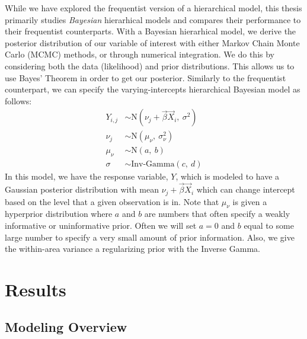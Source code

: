 \documentclass[12pt,twoside]{reedthesis}
\begin{document}
While we have explored the frequentist version of a hierarchical model, this thesis primarily studies \emph{Bayesian} hierarhical models and compares their performance to their frequentist counterparts. With a Bayesian hierarhical model, we derive the posterior distribution of our variable of interest with either Markov Chain Monte Carlo (MCMC) methods, or through numerical integration. We do this by considering both the data (likelihood) and prior distributions. This allows us to use Bayes' Theorem in order to get our posterior. Similarly to the frequentist counterpart, we can specify the varying-intercepts hierarchical Bayesian model as follows:
\begin{align}
Y_{i,j} &\sim \text{N}(\nu_j + \vec\beta\vec X_i,~ \sigma^2) \\
\nu_j &\sim \text{N}(\mu_\nu,~ \sigma^2_\nu) \\
\mu_\nu &\sim \text{N}(a,~b) \\
\sigma &\sim \text{Inv-Gamma}(c,~d)
\end{align}
In this model, we have the response variable, \(Y\), which is modeled to have a Gaussian posterior distribution with mean \(\nu_j + \vec\beta\vec X_i\) which can change intercept based on the level that a given observation is in. Note that \(\mu_\nu\) is given a hyperprior distribution where \(a\) and \(b\) are numbers that often specify a weakly informative or uninformative prior. Often we will set \(a=0\) and \(b\) equal to some large number to specify a very small amount of prior information. Also, we give the within-area variance a regularizing prior with the Inverse Gamma.

\hypertarget{results}{%
\chapter{Results}\label{results}}

\hypertarget{modeling-overview}{%
\section{Modeling Overview}\label{modeling-overview}}
\end{document}
